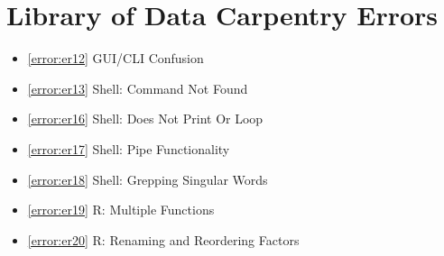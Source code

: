 \documentclass[12pt]{article}
\begin{document}
\section{Library of Data Carpentry Errors}
\begin{itemize}
\renewcommand{\labelitemi}{}
    \item \ref{error:er12} GUI/CLI Confusion
    \item \ref{error:er13} Shell: Command Not Found
    \item \ref{error:er16} Shell: Does Not Print Or Loop
    \item \ref{error:er17} Shell: Pipe Functionality
    \item \ref{error:er18} Shell: Grepping Singular Words
    \item \ref{error:er19} R: Multiple Functions
    \item \ref{error:er20} R: Renaming and Reordering Factors
\end{itemize}
\end{document}
